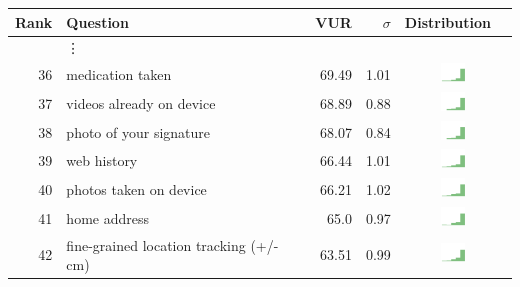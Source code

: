 \begin{table}[t]
\begin{center}
\small
\begin{tabular}{| r | l | r | r | r | r |}
\hline
Rank & Question & VUR & $\sigma$ & Distribution \\
\hline
& \vdots & & & \\
36 & medication taken & 69.49 & 1.01 & \includegraphics[width = 2cm, height = 0.5cm]{tex-inputs/table-images/learnedwhatmedicationyoutakecombined} \\ 
37 & videos already on device & 68.89 & 0.88 & \includegraphics[width = 2cm, height = 0.5cm]{tex-inputs/table-images/sharedvideosyoutookwhicharealreadyonyourdevicecombined} \\ 
38 & photo of your signature & 68.07 & 0.84 & \includegraphics[width = 2cm, height = 0.5cm]{tex-inputs/table-images/tookapictureofyoursignaturecombined} \\ 
39 & web history & 66.44 & 1.01 & \includegraphics[width = 2cm, height = 0.5cm]{tex-inputs/table-images/learnedwhatwebsitesyougotocombined} \\ 
40 & photos taken on device & 66.21 & 1.02 & \includegraphics[width = 2cm, height = 0.5cm]{tex-inputs/table-images/sharedphotosyoutookwhicharealreadyonyourdevicecombined} \\ 
41 & home address & 65.0 & 0.97 & \includegraphics[width = 2cm, height = 0.5cm]{tex-inputs/table-images/learnedwhereyoulivesomehowcombined} \\ 
42 & fine-grained location tracking (+/- cm) & 63.51 & 0.99 & \includegraphics[width = 2cm, height = 0.5cm]{tex-inputs/table-images/trackedwhereyouareveryaccurately(whereyouareinaroom)combined} \\ 

\end{tabular}
\end{center}
\end{table}
